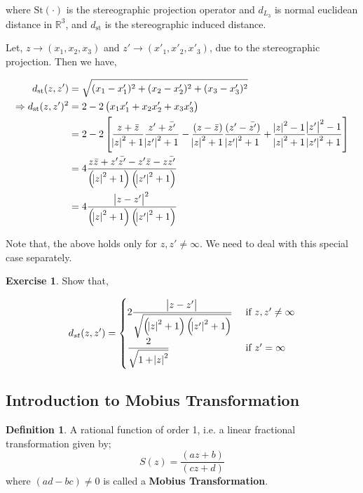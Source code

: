 \documentclass[12pt]{article}
\newcommand{\R}{\mathbb{R}}
\theoremstyle{definition}
\newtheorem{defn}{Definition}
\newtheorem{ex}{Exercise}
\newenvironment{definition}{
\begin{tcolorbox}[colback=green!5!white,colframe=green!75!black, parbox = false]\begin{defn} }{\end{defn}\end{tcolorbox} }
\newenvironment{exercise}{
\begin{tcolorbox}[colback=red!5!white,colframe=red!75!black, parbox = false]\begin{ex} }{\end{ex}\end{tcolorbox} }
\begin{document}
where $\text{St}(\cdot)$ is the stereographic projection operator and $d_{L_3}$ is normal euclidean distance in $\R^3$, and $d_{\text{st}}$ is the stereographic induced distance.

Let, $z \rightarrow (x_1, x_2, x_3)$ and $z' \rightarrow (x'_1, x'_2, x'_3)$, due to the stereographic projection. Then we have,

\begin{align*}
    d_{\text{st}}(z, z') & = \sqrt{ (x_1 - x'_1)^2 + (x_2 - x'_2)^2 + (x_3 - x'_3)^2 }\\
    \Rightarrow d_{\text{st}}(z, z')^2 & = 2 - 2\left( x_1x'_1 + x_2x'_2 + x_3x'_3 \right)\\
    & = 2 - 2 \left[ \dfrac{z + \bar{z}}{\abs{z}^2 + 1} \dfrac{z' + \bar{z'}}{\abs{z'}^2 + 1} - \dfrac{(z - \bar{z})}{\abs{z}^2 + 1} \dfrac{(z' - \bar{z'})}{\abs{z'}^2 + 1} + \dfrac{\abs{z}^2 -1}{\abs{z}^2 + 1} \dfrac{\abs{z'}^2 -1}{\abs{z'}^2 + 1} \right]\\
    & = 4\dfrac{z\bar{z} + z'\bar{z'} - z'\bar{z} - z\bar{z'} }{\left(\abs{z}^2 + 1\right)\left(\abs{z'}^2 + 1\right) }\\
    & = 4\dfrac{\abs{z - z'}^2}{ \left(\abs{z}^2 + 1\right)\left(\abs{z'}^2 + 1\right) }
\end{align*}

Note that, the above holds only for $z, z' \neq \infty$. We need to deal with this special case separately. 

\begin{exercise}
    Show that, 
    
    $$
    d_{st}(z, z') = 
    \begin{cases}
        2 \dfrac{\abs{z - z'}}{ \sqrt{\left(\abs{z}^2 + 1\right)\left(\abs{z'}^2 + 1\right)} } & \text{ if } z, z' \neq \infty\\
        \dfrac{2}{\sqrt{1 + \abs{z}^2}} & \text{ if } z' = \infty
    \end{cases}
    $$
\end{exercise}

\subsection{Introduction to Mobius Transformation}

\begin{definition}
    A rational function of order 1, i.e. a linear fractional transformation given by;
    $$S(z) = \dfrac{(az + b)}{(cz + d)}$$
    where $(ad -bc) \neq 0$ is called a \textbf{Mobius Transformation}.
\end{definition}
\end{document}
